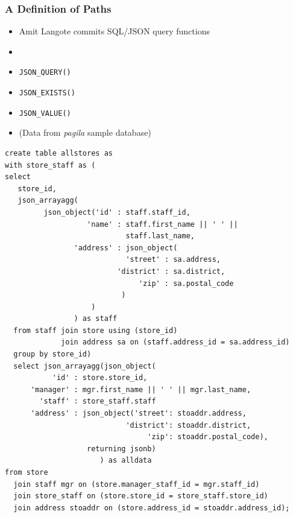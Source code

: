 \begin{frame}
  \frametitle{A Definition of Paths}
  \begin{itemize}
    \item Amit Langote commits SQL/JSON query functions
    \item[]

    \item \texttt{JSON\_QUERY()}
    \item \texttt{JSON\_EXISTS()}
    \item \texttt{JSON\_VALUE()}
  \end{itemize}
\end{frame}

\begin{frame}[fragile]

\begin{itemize} \scriptsize \item (Data from \textit{pagila} sample database) \end{itemize}

\scriptsize
  \begin{lstlisting}[basicstyle=\tiny\ttfamily]
create table allstores as
with store_staff as (
select
   store_id,
   json_arrayagg(
         json_object('id' : staff.staff_id,
                   'name' : staff.first_name || ' ' ||
                            staff.last_name,
                'address' : json_object(
                            'street' : sa.address,
                          'district' : sa.district,
                               'zip' : sa.postal_code
			               )
                    )
                ) as staff
  from staff join store using (store_id)
             join address sa on (staff.address_id = sa.address_id)
  group by store_id)
  select json_arrayagg(json_object( 
           'id' : store.store_id,
      'manager' : mgr.first_name || ' ' || mgr.last_name,
        'staff' : store_staff.staff
      'address' : json_object('street': stoaddr.address,
                            'district': stoaddr.district,
                                 'zip': stoaddr.postal_code),
                   returning jsonb)
                      ) as alldata
from store
  join staff mgr on (store.manager_staff_id = mgr.staff_id)
  join store_staff on (store.store_id = store_staff.store_id)
  join address stoaddr on (store.address_id = stoaddr.address_id);
  \end{lstlisting}
\end{frame}


